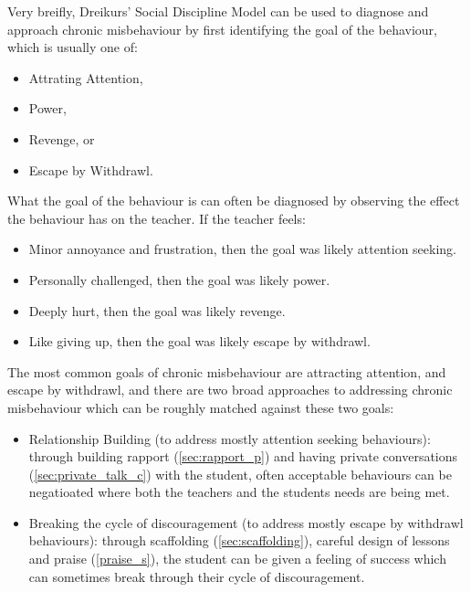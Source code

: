 \documentclass[12pt]{report}
\begin{document}
Very breifly, Dreikurs' Social Discipline Model can be used to diagnose and approach chronic misbehaviour by first identifying the goal of the behaviour, which is usually one of:
\begin{itemize}
  \item Attrating Attention,
  \item Power,
  \item Revenge, or
  \item Escape by Withdrawl.
\end{itemize}
What the goal of the behaviour is can often be diagnosed by observing the effect the behaviour has on the teacher. If the teacher feels:
\begin{itemize}
  \item Minor annoyance and frustration, then the goal was likely attention seeking.
  \item Personally challenged, then the goal was likely power. 
  \item Deeply hurt, then the goal was likely revenge.
  \item Like giving up, then the goal was likely escape by withdrawl.
\end{itemize}
The most common goals of chronic misbehaviour are attracting attention, and escape by withdrawl, and there are two broad approaches to addressing chronic misbehaviour which can be roughly matched against these two goals:
\begin{itemize}
  \item Relationship Building (to address mostly attention seeking behaviours): through building rapport (\ref{sec:rapport_p}) and having private conversations (\ref{sec:private_talk_c}) with the student, often acceptable behaviours can be negatioated where both the teachers and the students needs are being met.
  \item Breaking the cycle of discouragement (to address mostly escape by withdrawl behaviours): through scaffolding (\ref{sec:scaffolding}), careful design of lessons and praise (\ref{praise_s}), the student can be given a feeling of success which can sometimes break through their cycle of discouragement.
\end{itemize}
  
\end{document}
